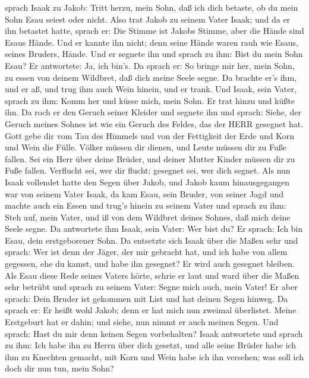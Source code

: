sprach Isaak zu Jakob: Tritt herzu, mein Sohn, daß ich dich betaste, ob
du mein Sohn Esau seiest oder nicht.  Also trat Jakob zu
seinem Vater Isaak; und da er ihn betastet hatte, sprach er: Die Stimme
ist Jakobs Stimme, aber die Hände sind Esaus Hände.  Und er
kannte ihn nicht; denn seine Hände waren rauh wie Esaus, seines Bruders,
Hände. Und er segnete ihn  und sprach zu ihm: Bist du mein
Sohn Esau? Er antwortete: Ja, ich bin's.  Da sprach er: So
bringe mir her, mein Sohn, zu essen von deinem Wildbret, daß dich meine
Seele segne. Da brachte er's ihm, und er aß, und trug ihm auch Wein
hinein, und er trank.  Und Isaak, sein Vater, sprach zu
ihm: Komm her und küsse mich, mein Sohn.  Er trat hinzu und
küßte ihn. Da roch er den Geruch seiner Kleider und segnete ihn und
sprach: Siehe, der Geruch meines Sohnes ist wie ein Geruch des Feldes,
das der HERR gesegnet hat.  Gott gebe dir vom Tau des
Himmels und von der Fettigkeit der Erde und Korn und Wein die Fülle.
 Völker müssen dir dienen, und Leute müssen dir zu Fuße
fallen. Sei ein Herr über deine Brüder, und deiner Mutter Kinder müssen
dir zu Fuße fallen. Verflucht sei, wer dir flucht; gesegnet sei, wer
dich segnet.  Als nun Isaak vollendet hatte den Segen über
Jakob, und Jakob kaum hinausgegangen war von seinem Vater Isaak, da kam
Esau, sein Bruder, von seiner Jagd  und machte auch ein
Essen und trug's hinein zu seinem Vater und sprach zu ihm: Steh auf,
mein Vater, und iß von dem Wildbret deines Sohnes, daß mich deine Seele
segne.  Da antwortete ihm Isaak, sein Vater: Wer bist du?
Er sprach: Ich bin Esau, dein erstgeborener Sohn.  Da
entsetzte sich Isaak über die Maßen sehr und sprach: Wer ist denn der
Jäger, der mir gebracht hat, und ich habe von allem gegessen, ehe du
kamst, und habe ihn gesegnet? Er wird auch gesegnet bleiben.
 Als Esau diese Rede seines Vaters hörte, schrie er laut
und ward über die Maßen sehr betrübt und sprach zu seinem Vater: Segne
mich auch, mein Vater!  Er aber sprach: Dein Bruder ist
gekommen mit List und hat deinen Segen hinweg.  Da sprach
er: Er heißt wohl Jakob; denn er hat mich nun zweimal überlistet. Meine
Erstgeburt hat er dahin; und siehe, nun nimmt er auch meinen Segen. Und
sprach: Hast du mir denn keinen Segen vorbehalten?  Isaak
antwortete und sprach zu ihm: Ich habe ihn zu Herrn über dich gesetzt,
und alle seine Brüder habe ich ihm zu Knechten gemacht, mit Korn und
Wein habe ich ihn versehen; was soll ich doch dir nun tun, mein Sohn?

